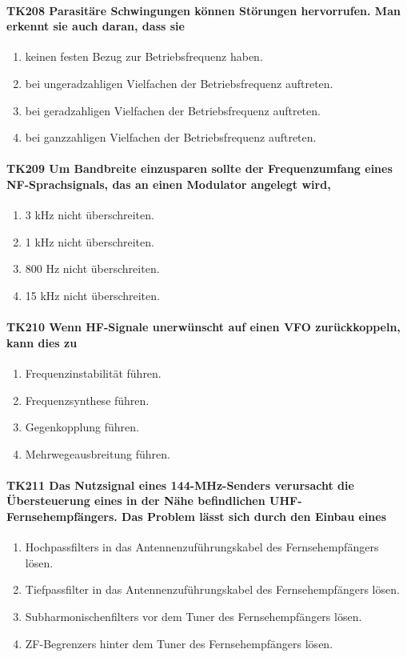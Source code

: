 \documentclass[8pt]{article}
\begin{document}
\paragraph*{TK208 Parasitäre Schwingungen können Störungen hervorrufen. Man erkennt sie auch daran, dass sie} 
\begin{enumerate}[nolistsep,label=\Alph*]
\item keinen festen Bezug zur Betriebsfrequenz haben.
\item bei ungeradzahligen Vielfachen der Betriebsfrequenz auftreten.
\item bei geradzahligen Vielfachen der Betriebsfrequenz auftreten.
\item bei ganzzahligen Vielfachen der Betriebsfrequenz auftreten.
\end{enumerate}

\paragraph*{TK209 Um Bandbreite einzusparen sollte der Frequenzumfang eines NF-Sprachsignals, das an einen Modulator angelegt wird,}
\begin{enumerate}[nolistsep,label=\Alph*]
\item 3 kHz nicht überschreiten.
\item 1 kHz nicht überschreiten.
\item 800 Hz nicht überschreiten.
\item 15 kHz nicht überschreiten.
\end{enumerate}

\paragraph*{TK210 Wenn HF-Signale unerwünscht auf einen VFO zurückkoppeln, kann dies zu} 
\begin{enumerate}[nolistsep,label=\Alph*]
\item Frequenzinstabilität führen.
\item Frequenzsynthese führen.
\item Gegenkopplung führen.
\item Mehrwegeausbreitung führen.
\end{enumerate}

\paragraph*{TK211 Das Nutzsignal eines 144-MHz-Senders verursacht die Übersteuerung eines in der Nähe befindlichen UHF-Fernsehempfängers. Das Problem lässt sich durch den Einbau eines}
\begin{enumerate}[nolistsep,label=\Alph*]
\item Hochpassfilters in das Antennenzuführungskabel des Fernsehempfängers lösen.
\item Tiefpassfilter in das Antennenzuführungskabel des Fernsehempfängers lösen.
\item Subharmonischenfilters vor dem Tuner des Fernsehempfängers lösen.
\item ZF-Begrenzers hinter dem Tuner des Fernsehempfängers lösen.
\end{enumerate}
\end{document}
